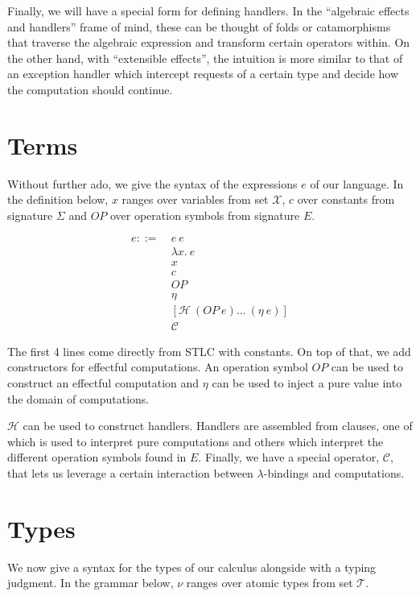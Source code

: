 Finally, we will have a special form for defining handlers. In the
``algebraic effects and handlers'' frame of mind, these can be thought of
folds or catamorphisms that traverse the algebraic expression and transform
certain operators within. On the other hand, with ``extensible effects'',
the intuition is more similar to that of an exception handler which
intercept requests of a certain type and decide how the computation should
continue.

\section{Terms}

Without further ado, we give the syntax of the expressions $e$ of our
language. In the definition below, $x$ ranges over variables from set
$\mathcal{X}$, $c$ over constants from signature $\Sigma$ and $OP$ over
operation symbols from signature $E$.

\begin{align*}
  e ::= \
  & e\ e \\
  & \lambda x.\ e \\
  & x \\
  & c \\
  & OP \\
  & \eta \\
  & \left[\mathcal{H}\ (OP\ e) \ldots\ (\eta\ e)\right]\\
  & \mathcal{C}
\end{align*}

The first 4 lines come directly from STLC with constants. On top of that,
we add constructors for effectful computations. An operation symbol $OP$
can be used to construct an effectful computation and $\eta$ can be used to
inject a pure value into the domain of computations.

$\mathcal{H}$ can be used to construct handlers. Handlers are assembled
from clauses, one of which is used to interpret pure computations and
others which interpret the different operation symbols found in
$E$. Finally, we have a special operator, $\mathcal{C}$, that lets us
leverage a certain interaction between $\lambda$-bindings and computations.


\section{Types}

We now give a syntax for the types of our calculus alongside with a typing
judgment. In the grammar below, $\nu$ ranges over atomic types from set
$\mathcal{T}$.

